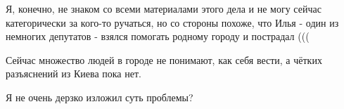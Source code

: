 Я, конечно, не знаком со всеми материалами этого дела и не могу сейчас
категорически за кого-то ручаться, но со стороны похоже, что Илья - один из
немногих депутатов -  взялся помогать родному городу и пострадал (((

Сейчас множество людей в городе не понимают, как себя вести, а чётких
разъяснений из Киева пока нет.

Я не очень дерзко изложил суть проблемы?

